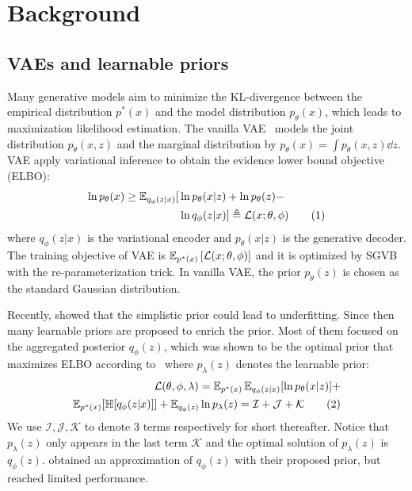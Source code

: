 \section{Background}

\subsection{VAEs and learnable priors}

Many generative models aim to minimize the KL-divergence between the empirical distribution $p^*(x)$ and the model distribution $p_\theta(x)$, which leads to maximization likelihood estimation. The vanilla VAE~\cite{kingma2014auto} models the joint distribution $p_\theta(x, z)$ and the marginal distribution by $p_\theta(x) = \int p_\theta(x, z) \dd z$. VAE apply variational inference to obtain the evidence lower bound objective (ELBO): 
\begin{align*} \label{eq:ELBO}
\ln p_\theta(x) \geq \operatorname{\mathbb{E}}_{q_\phi(z|x)} [  &  \ln p_\theta(x|z) + \ln p_\theta(z) - \\ & \ln q_\phi(z|x) ] 
\triangleq \mathcal{L}(x; \theta, \phi) \tag{1}
\end{align*}
where $q_\phi(z|x)$ is the variational encoder and $p_\theta(x|z)$ is the generative decoder. The training objective of VAE is $\operatorname{\mathbb{E}}_{{p^*(x)}}\left[{\mathcal{L}(x; \theta, \phi)}\right]$ and it is optimized by SGVB with the re-parameterization trick. In vanilla VAE, the prior $p_\theta(z)$ is chosen as the standard Gaussian distribution. 

Recently, \cite{tomczak2018vae} showed that the simplistic prior could lead to underfitting. Since then many learnable priors are proposed to enrich the prior. Most of them focused on the aggregated posterior $q_\phi(z)$, which was shown to be the optimal prior that maximizes ELBO according to~\cite{tomczak2018vae} where $p_\lambda(z)$ denotes the learnable prior:
\begin{align*} \label{eq:second-decomposition}
\mathcal{L}(\theta, \phi, \lambda) = \operatorname{\mathbb{E}}_{p^*(x)}\operatorname{\mathbb{E}}_{q_\phi(z|x)} [ \ln p_\theta(x|z)] + \\ 
\operatorname{\mathbb{E}}_{p^*(x)}[\mathbb{H}[q_\phi(z|x)]] + \operatorname{\mathbb{E}}_{q_\phi(z)} \ln p_\lambda(z) = \mathcal{I} + \mathcal{J} + \mathcal{K} \tag{2}
\end{align*}
We use $\mathcal{I}, \mathcal{J}, \mathcal{K}$ to denote 3 terms respectively for short thereafter. 
Notice that $p_\lambda(z)$ only appears in the last term $\mathcal{K}$ and the optimal solution of $p_\lambda(z)$ is $q_\phi(z)$. \cite{tomczak2018vae,takahashi2019variational} obtained an approximation of $q_\phi(z)$ with their proposed prior, but reached limited performance. 

